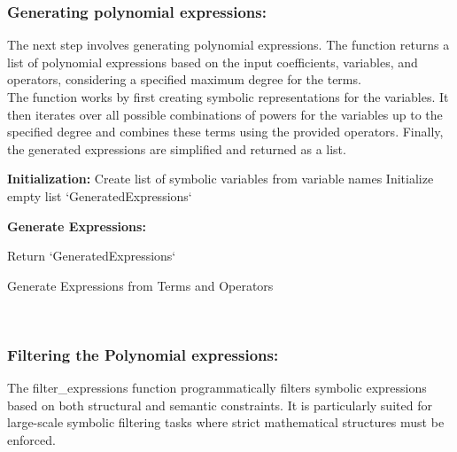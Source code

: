 \documentclass{article}
\begin{document}
\subsubsection{Generating polynomial expressions:}

The next step involves generating polynomial expressions. The function returns a list of polynomial expressions based on the input coefficients, variables, and operators, considering a specified maximum degree for the terms.\\

The function works by first creating symbolic representations for the variables. It then iterates over all possible combinations of powers for the variables up to the specified degree and combines these terms using the provided operators. Finally, the generated expressions are simplified and returned as a list.\\



\begin{algorithm}[H]
\SetAlgoLined
{}

\textbf{Initialization:}\;
Create list of symbolic variables from variable names\;
Initialize empty list `GeneratedExpressions`\;

\textbf{Generate Expressions:}\;

Return `GeneratedExpressions`\;

\caption{Generate Expressions from Terms and Operators}
\label{alg:generate_expressions_terms} %
\end{algorithm}\\




\subsubsection{Filtering the Polynomial expressions:}

The filter\_expressions function programmatically filters symbolic expressions based on both structural and semantic constraints. It is particularly suited for large-scale symbolic filtering tasks where strict mathematical structures must be enforced.\\
\end{document}
